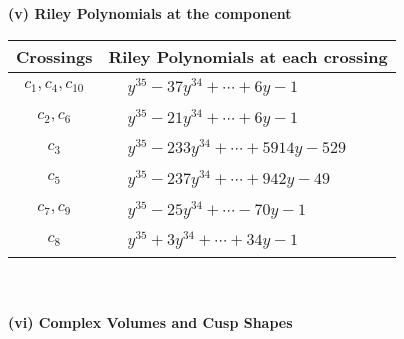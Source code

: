 \documentclass[1p]{elsarticle_modified}
\theoremstyle{definition}
\begin{document}
\newpage\renewcommand{\arraystretch}{1}
\flushleft \textbf{(v) Riley Polynomials at the component}\newline \\
\begin{tabular}{m{50pt}|m{274pt}}
Crossings & \hspace{64pt}Riley Polynomials at each crossing \\
\hline $$\begin{aligned}c_{1},c_{4},c_{10}\end{aligned}$$&$\begin{aligned}
&y^{35}-37 y^{34}+\cdots+6 y-1
\end{aligned}$\\
\hline $$\begin{aligned}c_{2},c_{6}\end{aligned}$$&$\begin{aligned}
&y^{35}-21 y^{34}+\cdots+6 y-1
\end{aligned}$\\
\hline $$\begin{aligned}c_{3}\end{aligned}$$&$\begin{aligned}
&y^{35}-233 y^{34}+\cdots+5914 y-529
\end{aligned}$\\
\hline $$\begin{aligned}c_{5}\end{aligned}$$&$\begin{aligned}
&y^{35}-237 y^{34}+\cdots+942 y-49
\end{aligned}$\\
\hline $$\begin{aligned}c_{7},c_{9}\end{aligned}$$&$\begin{aligned}
&y^{35}-25 y^{34}+\cdots-70 y-1
\end{aligned}$\\
\hline $$\begin{aligned}c_{8}\end{aligned}$$&$\begin{aligned}
&y^{35}+3 y^{34}+\cdots+34 y-1
\end{aligned}$\\
\hline
\end{tabular}\\~\\
\newpage\flushleft \textbf{(vi) Complex Volumes and Cusp Shapes}
\end{document}
